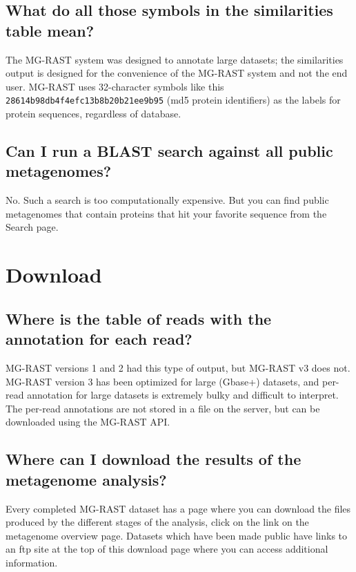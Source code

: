 \documentclass[12pt,fullpage]{report}
\begin{document}
\subsection*{What do all those symbols in the similarities table mean?}
The MG-RAST system was designed to annotate large datasets;  the similarities output is designed for the convenience of the MG-RAST system and not the end user.   MG-RAST uses 32-character symbols like this \texttt{28614b98db4f4efc13b8b20b21ee9b95} (md5 protein identifiers) as the labels for protein sequences, regardless of database.
\subsection*{Can I run a BLAST search against all public metagenomes?}
No.   Such a search is too computationally expensive. But you can find public metagenomes that contain proteins that hit your favorite sequence from the Search page.
\section{Download}
\subsection*{Where is the table of reads with the annotation for each read?}
MG-RAST versions 1 and 2 had this type of output, but MG-RAST v3 does not.   MG-RAST version 3 has been optimized for large (Gbase+) datasets, and per-read annotation for large datasets is extremely bulky and difficult to interpret. The per-read annotations are not stored in a file on the server, but can be downloaded using the MG-RAST API.
\subsection*{Where can I download the results of the metagenome analysis?}
Every completed MG-RAST dataset has a page where you can download the files produced by the different stages of the analysis, click on the link on the metagenome overview page. Datasets which have been made public have links to an ftp site at the top of this download page where you can access additional information.
\end{document}
